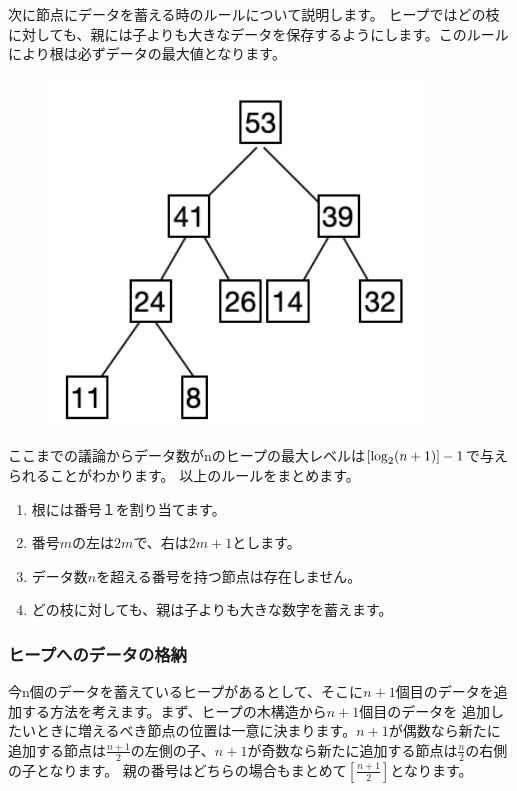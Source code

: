 \documentclass[dvipdfmx,pic,eepic,ecltree]{jarticle}
\begin{document}
次に節点にデータを蓄える時のルールについて説明します。
ヒープではどの枝に対しても、親には子よりも大きなデータを保存するようにします。このルールにより根は必ずデータの最大値となります。
 \begin{figure}[H]
 \begin{center}
\includegraphics[width=100mm]{heap_store.png}
\end{center}
\end{figure}
ここまでの議論からデータ数がnのヒープの最大レベルは$[{\rm log}_{2}(n+1)]-1$で与えられることがわかります。
以上のルールをまとめます。
\begin{enumerate}
\item 根には番号１を割り当てます。
\item 番号$m$の左は$2m$で、右は$2m+1$とします。
\item データ数$n$を超える番号を持つ節点は存在しません。
\item どの枝に対しても、親は子よりも大きな数字を蓄えます。
\end{enumerate}

\subsubsection{ヒープへのデータの格納}
今n個のデータを蓄えているヒープがあるとして、そこに$n+1$個目のデータを追加する方法を考えます。まず、ヒープの木構造から$n+1$個目のデータを
追加したいときに増えるべき節点の位置は一意に決まります。$n+1$が偶数なら新たに追加する節点は$\frac{n+1}{2}$の左側の子、$n+1$が奇数なら新たに追加する節点は$\frac{n}{2}$の右側の子となります。
親の番号はどちらの場合もまとめて$[\frac{n+1}{2}]$となります。
\end{document}
